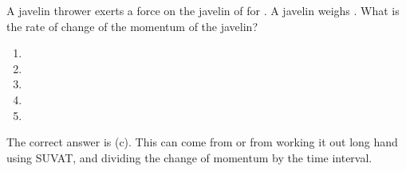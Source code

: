 
\begin{problem}[A1989PIQ1l] 
{A javelin thrower exerts a force on the javelin of  for . A javelin weighs . What is the rate of change of the momentum of the javelin?
\begin{enumerate}
	\item {}
	\item {}
	\item {} \answer
	\item {}
	\item {}
\end{enumerate}
}
{}
{The correct answer is (c). This can come from  or from working it out long hand using SUVAT, and dividing the change of momentum by the time interval.}
\end{problem}